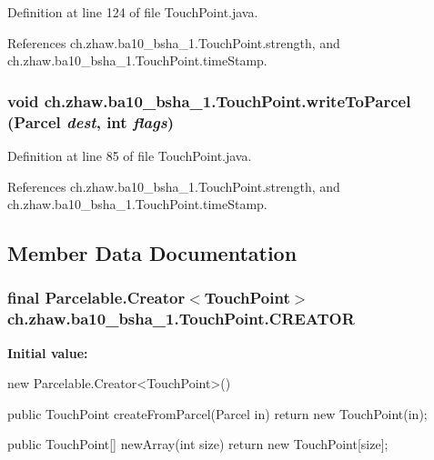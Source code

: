 Definition at line 124 of file TouchPoint.java.

References ch.zhaw.ba10\_\-bsha\_\-1.TouchPoint.strength, and ch.zhaw.ba10\_\-bsha\_\-1.TouchPoint.timeStamp.\hypertarget{classch_1_1zhaw_1_1ba10__bsha__1_1_1TouchPoint_a8cfc22332015bceee96d2fdafc321290}{
\subsubsection[{writeToParcel}]{\setlength{\rightskip}{0pt plus 5cm}void ch.zhaw.ba10\_\-bsha\_\-1.TouchPoint.writeToParcel (Parcel {\em dest}, \/  int {\em flags})}}
\label{classch_1_1zhaw_1_1ba10__bsha__1_1_1TouchPoint_a8cfc22332015bceee96d2fdafc321290}


Definition at line 85 of file TouchPoint.java.

References ch.zhaw.ba10\_\-bsha\_\-1.TouchPoint.strength, and ch.zhaw.ba10\_\-bsha\_\-1.TouchPoint.timeStamp.

\subsection{Member Data Documentation}
\hypertarget{classch_1_1zhaw_1_1ba10__bsha__1_1_1TouchPoint_a0f386eacc8abbc547cd2a5b23630d211}{
\subsubsection[{CREATOR}]{\setlength{\rightskip}{0pt plus 5cm}final Parcelable.Creator$<${\bf TouchPoint}$>$ {\bf ch.zhaw.ba10\_\-bsha\_\-1.TouchPoint.CREATOR}}}
\label{classch_1_1zhaw_1_1ba10__bsha__1_1_1TouchPoint_a0f386eacc8abbc547cd2a5b23630d211}
{\bfseries Initial value:}
\begin{DoxyCode}
 new Parcelable.Creator<TouchPoint>() {
                public TouchPoint createFromParcel(Parcel in) {
                        return new TouchPoint(in);
                }

                public TouchPoint[] newArray(int size) {
                        return new TouchPoint[size];
                }
        }
\end{DoxyCode}


